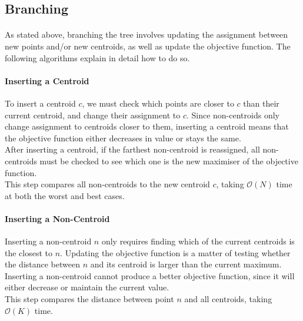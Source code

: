 \subsection{Branching}
\paragraph{}
As stated above, branching the tree involves updating the assignment between new points and/or new centroids, as well as update the objective function. The following algorithms explain in detail how to do so.
\paragraph{Inserting a Centroid}
To insert a centroid $c$, we must check which points are closer to $c$ than their current centroid, and change their assignment to $c$.
Since non-centroids only change assignment to centroids closer to them, inserting a centroid means that the objective function either decreases in value or stays the same.\\
After inserting a centroid, if the farthest non-centroid is reassigned, all non-centroids must be checked to see which one is the new maximiser of the objective function.\\
This step compares all non-centroids to the new centroid $c$, taking $\mathcal{O}(N)$ time at both the worst and best cases.

\paragraph{Inserting a Non-Centroid}
Inserting a non-centroid $n$ only requires finding which of the current centroids is the closest to $n$. Updating the objective function is a matter of testing whether the distance between $n$ and its centroid is larger than the current maximum.\\
Inserting a non-centroid cannot produce a better objective function, since it will either decrease or maintain the current value. \\
This step compares the distance between point $n$ and all centroids, taking $\mathcal{O}(K)$ time.

